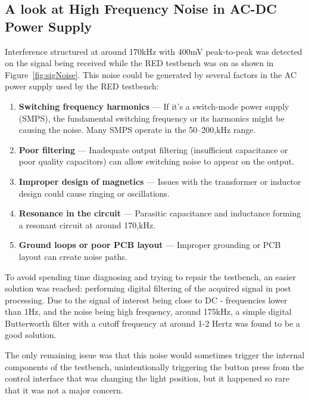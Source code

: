 \subsection*{A look at High Frequency Noise in AC-DC Power Supply}
Interference structured at around 170kHz with 400mV peak-to-peak was detected on the signal being received while the RED testbench was on as shown in Figure~\ref{fig:sigNoise}. This noise could be generated by several factors in the AC power supply used by the RED testbench:
\begin{enumerate}
\item \textbf{Switching frequency harmonics} --- If it's a switch-mode power supply (SMPS), the fundamental switching frequency or its harmonics might be causing the noise. Many SMPS operate in the 50--200,kHz range.
\item \textbf{Poor filtering} --- Inadequate output filtering (insufficient capacitance or poor quality capacitors) can allow switching noise to appear on the output.
\item \textbf{Improper design of magnetics} --- Issues with the transformer or inductor design could cause ringing or oscillations.
\item \textbf{Resonance in the circuit} --- Parasitic capacitance and inductance forming a resonant circuit at around 170,kHz.
\item \textbf{Ground loops or poor PCB layout} --- Improper grounding or PCB layout can create noise paths.~\cite{RefWorks:giuliattini2006prediction}
\end{enumerate}
To avoid spending time diagnosing and trying to repair the testbench, an easier solution was reached: performing digital filtering of the acquired signal in post processing. Due to the signal of interest being close to DC - frequencies lower than 1Hz, and the noise being high frequency, around 175kHz, a simple digital Butterworth filter with a cutoff frequency at around 1-2 Hertz was found to be a good solution.

The only remaining issue was that this noise would sometimes trigger the internal components of the testbench, unintentionally triggering the button press from the control interface that was changing the light position, but it happened so rare that it was not a major concern.